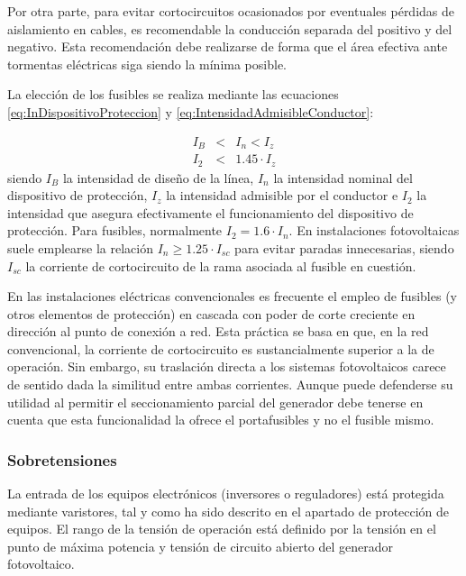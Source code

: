Por otra parte, para evitar cortocircuitos ocasionados por eventuales
pérdidas de aislamiento en cables, es recomendable la conducción separada
del positivo y del negativo. Esta recomendación debe realizarse de
forma que el área efectiva ante tormentas eléctricas siga siendo la
mínima posible.

La elección de los fusibles se realiza mediante las ecuaciones \ref{eq:InDispositivoProteccion}
y \ref{eq:IntensidadAdmisibleConductor}:

\begin{eqnarray}
I_{B} & < & I_{n}<I_{z}\label{eq:InDispositivoProteccion}\\
I_{2} & < & 1.45\cdot I_{z}\label{eq:IntensidadAdmisibleConductor}\end{eqnarray}
siendo $I_{B}$ la intensidad de diseño de la línea, $I_{n}$ la intensidad
nominal del dispositivo de protección, $I_{z}$ la intensidad admisible
por el conductor e $I_{2}$ la intensidad que asegura efectivamente
el funcionamiento del dispositivo de protección.  
Para fusibles, normalmente $I_{2}=1.6\cdot I_{n}$. En instalaciones
fotovoltaicas suele emplearse la relación $I_{n}\geq1.25\cdot I_{sc}$
para evitar paradas innecesarias, siendo $I_{sc}$ la corriente de
cortocircuito de la rama asociada al fusible en cuestión.

En las instalaciones eléctricas convencionales es frecuente el empleo
de fusibles (y otros elementos de protección) en cascada con poder
de corte creciente en dirección al punto de conexión a red. Esta práctica
se basa en que, en la red convencional, la corriente de cortocircuito
es sustancialmente superior a la de operación. Sin embargo, su traslación
directa a los sistemas fotovoltaicos carece de sentido dada la similitud
entre ambas corrientes. Aunque puede defenderse su utilidad al permitir
el seccionamiento parcial del generador debe tenerse en cuenta que
esta funcionalidad la ofrece el portafusibles y no el fusible mismo. 


\subsubsection{Sobretensiones}

La entrada de los equipos electrónicos (inversores o reguladores)
está protegida mediante varistores, tal y como ha sido descrito en
el apartado de protección de equipos. El rango de la tensión de operación
está definido por la tensión en el punto de máxima potencia y tensión
de circuito abierto del generador fotovoltaico.

